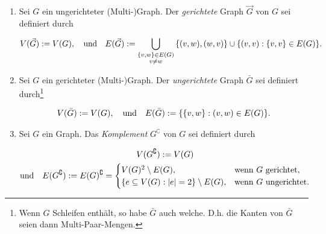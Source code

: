         \begin{definition} \label{def:operations_unary}

            \begin{enumerate}[
                label = \arabic*.,
                wide,
                labelindent = 0pt
            ]

                \item Sei $G$ ein ungerichteter (Multi-)Graph.
                Der \textit{gerichtete} Graph $\vec G$ von $G$ sei definiert durch
    
                \begin{align*}
                    V(\vec G) := V(G),
                    \quad
                    \text{und}
                    \quad
                    E(\vec G) := \bigcup_{\substack{{\left \{ v, w \right \}} \in E(G) \\ v \neq w}} {\left \{ (v, w), (w, v) \right \}} \cup {\left \{ (v, v): {\left \{ v, v \right \}} \in E(G) \right \}}.
                \end{align*}

                \item Sei $G$ ein gerichteter (Multi-)Graph.
                Der \textit{ungerichtete} Graph $\bar G$ sei definiert durch\footnote{Wenn $G$ Schleifen enthält, so habe $\bar G$ auch welche. D.h. die Kanten von $\bar G$ seien dann Multi-Paar-Mengen.}
    
                \begin{align*}
                    V(\bar G) := V(G),
                    \quad
                    \text{und}
                    \quad
                    E(\bar G) := {\left \{ {\left \{ v, w \right \}}: (v, w) \in E(G) \right \}}.
                \end{align*}

                \item Sei $G$ ein Graph.
                Das \textit{Komplement} $G^\complement$ von $G$ sei definiert durch

                \begin{multline*}
                    V(G^\complement) := V(G) \\
                    \text{und}
                    \quad
                    E(G^\complement)
                    :=
                    E(G)^\complement
                    =
                    \begin{cases}
                        V(G)^2 \setminus E(G),
                        & \text{wenn} ~ G ~ \text{gerichtet}, \\
                        {\left \{ e \subseteq V(G): |e| = 2 \right \}} \setminus E(G),
                        & \text{wenn} ~ G ~ \text{ungerichtet}.
                    \end{cases}
                \end{multline*}


\end{enumerate}
\end{definition}
